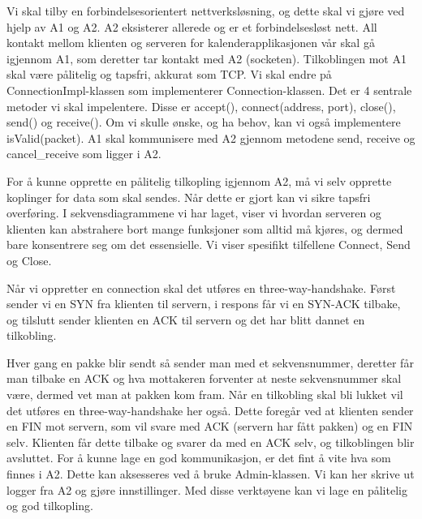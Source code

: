 Vi skal tilby en forbindelsesorientert nettverksløsning, og dette skal vi gjøre ved hjelp av A1 og A2. A2 eksisterer allerede og er et forbindelsesløst nett. All kontakt mellom klienten og serveren for kalenderapplikasjonen vår skal gå igjennom A1, som deretter tar kontakt med A2 (socketen). Tilkoblingen mot A1 skal være pålitelig og tapsfri, akkurat som TCP. Vi skal endre på ConnectionImpl-klassen som implementerer Connection-klassen. Det er 4 sentrale metoder vi skal impelentere. Disse er accept(), connect(address, port), close(), send() og receive(). Om vi skulle ønske, og ha behov, kan vi også implementere isValid(packet). A1 skal kommunisere med A2 gjennom metodene send, receive og cancel\_receive som ligger i A2.

For å kunne opprette en pålitelig tilkopling igjennom A2, må vi selv opprette koplinger for data som skal sendes. Når dette er gjort kan vi sikre tapsfri overføring. I sekvensdiagrammene vi har laget, viser vi hvordan serveren og klienten kan abstrahere bort mange funksjoner som alltid må kjøres, og dermed bare konsentrere seg om det essensielle. Vi viser spesifikt tilfellene Connect, Send og Close.

Når vi oppretter en connection skal det utføres en three-way-handshake. Først sender vi en SYN fra klienten til servern, i respons får vi en SYN-ACK tilbake, og tilslutt sender klienten en ACK til servern og det har blitt dannet en tilkobling.

Hver gang en pakke blir sendt så sender man med et sekvensnummer, deretter får man tilbake en ACK og hva mottakeren forventer at neste sekvensnummer skal være, dermed vet man at pakken kom fram. 
Når en tilkobling skal bli lukket vil det utføres en three-way-handshake her også. Dette foregår ved at klienten sender en FIN mot servern, som vil svare med ACK (servern har fått pakken) og en FIN selv. Klienten får dette tilbake og svarer da med en ACK selv, og tilkoblingen blir avsluttet.
For å kunne lage en god kommunikasjon, er det fint å vite hva som finnes i A2. Dette kan aksesseres ved å bruke Admin-klassen. Vi kan her skrive ut logger fra A2 og gjøre innstillinger. Med disse verktøyene kan vi lage en pålitelig og god tilkopling.